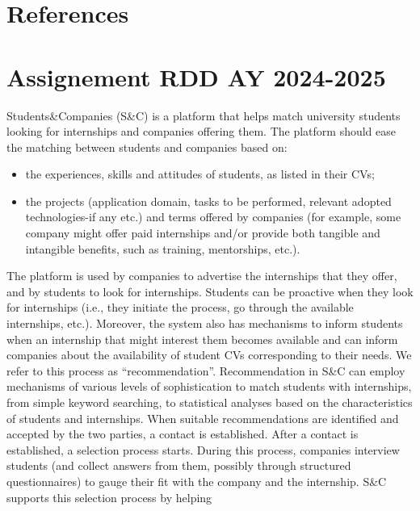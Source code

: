 \documentclass [11pt,twoside]{article}
\begin{document}
    \clearpage
    \section{References}
    \label{sect:references}
     
    
    \clearpage
    \appendix
    \section{Assignement RDD AY 2024-2025}
    \label{appendix:assignement}
    Students\&Companies (S\&C) is a platform that helps match university students looking for internships
    and companies offering them. The platform should ease the matching between students and
    companies based on:
    \begin{itemize}
        \item the experiences, skills and attitudes of students, as listed in their CVs;
        \item the projects (application domain, tasks to be performed, relevant adopted technologies-if any etc.) and terms offered by companies (for example, some company might offer paid internships and/or provide both tangible and intangible benefits, such as training, mentorships, etc.).
    \end{itemize}
The platform is used by companies to advertise the internships that they offer, and by students to look
for internships. Students can be proactive when they look for internships (i.e., they initiate the process,
go through the available internships, etc.). Moreover, the system also has mechanisms to inform
students when an internship that might interest them becomes available and can inform companies
about the availability of student CVs corresponding to their needs. We refer to this process as
“recommendation”.
Recommendation in S\&C can employ mechanisms of various levels of sophistication to match students
with internships, from simple keyword searching, to statistical analyses based on the characteristics of
students and internships.
When suitable recommendations are identified and accepted by the two parties, a contact is
established. After a contact is established, a selection process starts. During this process, companies
interview students (and collect answers from them, possibly through structured questionnaires) to
gauge their fit with the company and the internship. S\&C supports this selection process by helping
\end{document}
